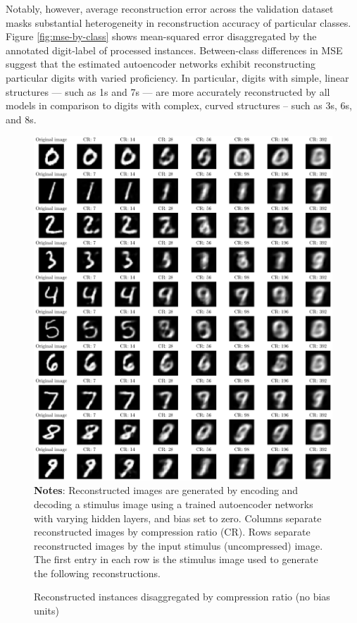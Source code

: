 Notably, however, average reconstruction error across the validation dataset masks substantial heterogeneity in reconstruction accuracy of particular classes.
Figure \ref{fig:mse-by-class} shows mean-squared error disaggregated by the annotated digit-label of processed instances.
Between-class differences in MSE suggest that the estimated autoencoder networks exhibit reconstructing particular digits with varied proficiency. 
In particular, digits with simple, linear structures --- such as 1s and 7s --- are more accurately reconstructed by all models in comparison to digits with complex, curved structures -- such as 3s, 6s, and 8s.  

\begin{figure}
    \caption{Reconstructed instances disaggregated by compression ratio (no bias units)}
	\label{fig:decoded-instances}
	\includegraphics[width=1.0\textwidth]{graphics/decoded_instances.pdf}
    \textbf{Notes}: Reconstructed images are generated by encoding and decoding a stimulus image using a trained autoencoder networks with varying hidden layers, and bias set to zero. Columns separate reconstructed images by compression ratio (CR). Rows separate reconstructed images by the input stimulus (uncompressed) image. The first entry in each row is the stimulus image used to generate the following reconstructions.
\end{figure}

